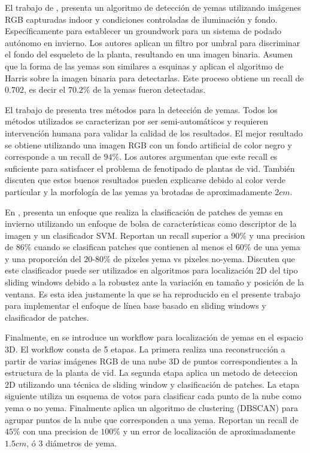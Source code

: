 \documentclass[a4paper,authoryear,review]{elsarticle}
\begin{document}
El trabajo de \citet{xu2014detection}, presenta un algoritmo de detección de yemas utilizando imágenes RGB capturadas indoor y condiciones controladas de iluminación y fondo. Específicamente para establecer un groundwork para un sistema de podado autónomo en invierno. Los autores aplican un filtro por umbral para discriminar el fondo del esqueleto de la planta, resultando en una imagen binaria. Asumen que la forma de las yemas son similares a esquinas y aplican el algoritmo de Harris sobre la imagen binaria para detectarlas. Este proceso obtiene un recall de $0.702$, es decir el $70.2\%$ de la yemas fueron detectadas. 

El trabajo de \citet{herzog2014objective} presenta tres métodos para la detección de yemas. Todos los métodos utilizados se caracterizan por ser semi-automáticos y requieren intervención humana para validar la calidad de los resultados. El mejor resultado se obtiene utilizando una imagen RGB con un fondo artificial de color negro y corresponde a un recall de $94\%$. Los autores argumentan que este recall es suficiente para satisfacer el problema de fenotipado de plantas de vid. También discuten que estos buenos resultados pueden explicarse debido al color verde particular y la morfología de las yemas ya brotadas de aproximadamente $2cm$. 

En \citet{perez2017image}, presenta un enfoque que realiza la clasificación de patches de yemas en invierno utilizando un enfoque de bolsa de características como descriptor de la imagen y un clasificador SVM. Reportan un recall superior a $90\%$ y una precision de $86\%$ cuando se clasifican patches que contienen al menos el $60\%$ de una yema y una proporción del $20$-$80\%$ de pixeles yema vs pixeles no-yema. Discuten que este clasificador puede ser utilizados en algoritmos para localización 2D del tipo sliding windows debido a la robustez ante la variación en tamaño y posición de la ventana. Es esta idea justamente la que se ha reproducido en el presente trabajo para implementar el enfoque de línea base basado en sliding windows y clasificador de patches.

Finalmente, en \citet{diaz2018grapevine} se introduce un workflow para localización de yemas en el espacio 3D. El workflow consta de 5 etapas. La primera realiza una reconstrucción a partir de varias imágenes RGB de una nube 3D de puntos correspondientes a la estructura de la planta de vid. La segunda etapa aplica un metodo de deteccion 2D utilizando una técnica de sliding window y clasificación de patches. La etapa siguiente utiliza un esquema de votos para clasificar cada punto de la nube como yema o no yema. Finalmente aplica un algoritmo de clustering (DBSCAN) para agrupar puntos de la nube que corresponden a una yema. Reportan un recall de $45\%$ con una precision de $100\%$ y un error de localización de aproximadamente $1.5cm$, ó 3 diámetros de yema. 
\end{document}

